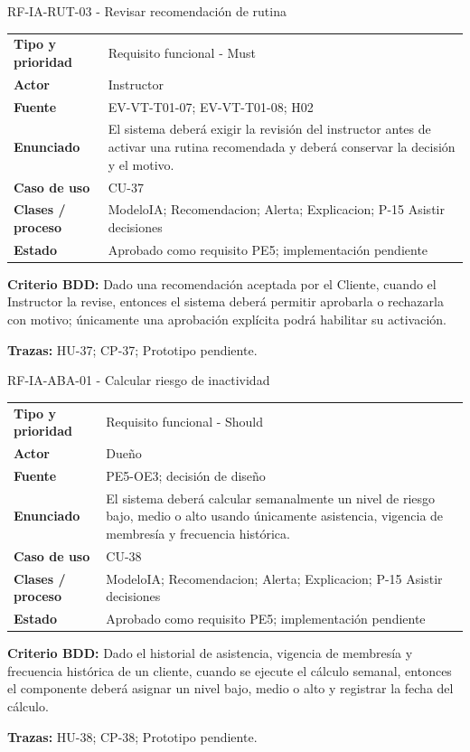 \begin{reqbox}{RF-IA-RUT-03 - Revisar recomendación de rutina}
\begin{tabularx}{\textwidth}{>{\bfseries}p{3.2cm}Y}
Tipo y prioridad & Requisito funcional - Must \\
Actor & Instructor \\
Fuente & EV-VT-T01-07; EV-VT-T01-08; H02 \\
Enunciado & El sistema deberá exigir la revisión del instructor antes de activar una rutina recomendada y deberá conservar la decisión y el motivo. \\
Caso de uso & CU-37 \\
Clases / proceso & ModeloIA; Recomendacion; Alerta; Explicacion; P-15 Asistir decisiones \\
Estado & Aprobado como requisito PE5; implementación pendiente \\
\end{tabularx}
\textbf{Criterio BDD:} Dado una recomendación aceptada por el Cliente, cuando el Instructor la revise, entonces el sistema deberá permitir aprobarla o rechazarla con motivo; únicamente una aprobación explícita podrá habilitar su activación.

\textbf{Trazas:} HU-37; CP-37; Prototipo pendiente.
\end{reqbox}


\begin{reqbox}{RF-IA-ABA-01 - Calcular riesgo de inactividad}
\begin{tabularx}{\textwidth}{>{\bfseries}p{3.2cm}Y}
Tipo y prioridad & Requisito funcional - Should \\
Actor & Dueño \\
Fuente & PE5-OE3; decisión de diseño \\
Enunciado & El sistema deberá calcular semanalmente un nivel de riesgo bajo, medio o alto usando únicamente asistencia, vigencia de membresía y frecuencia histórica. \\
Caso de uso & CU-38 \\
Clases / proceso & ModeloIA; Recomendacion; Alerta; Explicacion; P-15 Asistir decisiones \\
Estado & Aprobado como requisito PE5; implementación pendiente \\
\end{tabularx}
\textbf{Criterio BDD:} Dado el historial de asistencia, vigencia de membresía y frecuencia histórica de un cliente, cuando se ejecute el cálculo semanal, entonces el componente deberá asignar un nivel bajo, medio o alto y registrar la fecha del cálculo.

\textbf{Trazas:} HU-38; CP-38; Prototipo pendiente.
\end{reqbox}


